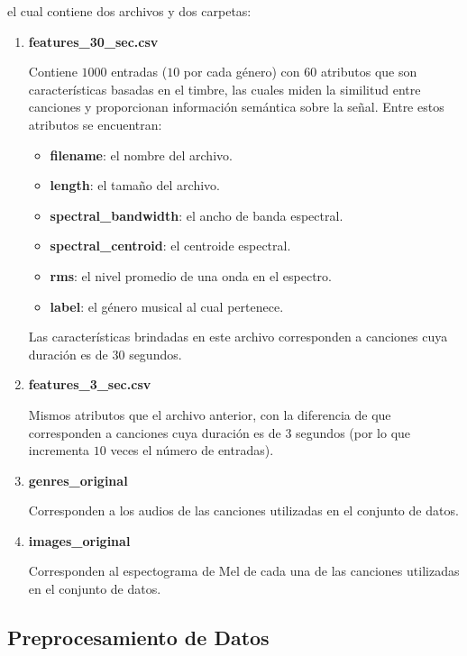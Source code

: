 \documentclass[letterpaper,11pt]{article}
\begin{document}
el cual contiene dos archivos y dos carpetas:
\begin{enumerate}
    \item \textbf{features\_30\_sec.csv}

    Contiene $1000$ entradas ($10$ por cada género) con $60$ atributos que 
    son características basadas en el timbre, las cuales miden la similitud 
    entre canciones y proporcionan información semántica sobre la señal. Entre 
    estos atributos se encuentran:

    \begin{itemize}
        \item \textbf{filename}: el nombre del archivo.
        \item \textbf{length}: el tamaño del archivo. 
        \item \textbf{spectral\_bandwidth}: el ancho de banda espectral.
        \item \textbf{spectral\_centroid}: el centroide espectral.
        \item \textbf{rms}: el nivel promedio de una onda en el espectro.
        \item \textbf{label}: el género musical al cual pertenece.  
    \end{itemize}

    Las características brindadas en este archivo corresponden a canciones 
    cuya duración es de $30$ segundos.

    \item \textbf{features\_3\_sec.csv}

    Mismos atributos que el archivo anterior, con la diferencia de que 
    corresponden a canciones cuya duración es de $3$ segundos (por lo 
    que incrementa $10$ veces el número de entradas).

    \item \textbf{genres\_original}

    Corresponden a los audios de las canciones utilizadas en el conjunto 
    de datos.

    \item \textbf{images\_original}

    Corresponden al espectograma de Mel de cada una de las canciones 
    utilizadas en el conjunto de datos.
\end{enumerate} 

\subsection{Preprocesamiento de Datos}
\end{document}
